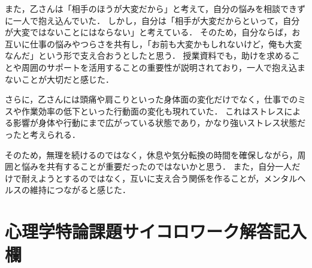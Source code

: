 \documentclass[titlepage,a4paper]{jsarticle}
\begin{document}
また，乙さんは「相手のほうが大変だから」と考えて，自分の悩みを相談できずに一人で抱え込んでいた．
しかし，自分は「相手が大変だからといって，自分が大変ではないことにはならない」と考えている．
そのため，自分ならば，お互いに仕事の悩みやつらさを共有し，「お前も大変かもしれないけど，俺も大変なんだ」という形で支え合おうとしたと思う．
授業資料でも，助けを求めることや周囲のサポートを活用することの重要性が説明されており，一人で抱え込まないことが大切だと感じた．

さらに，乙さんには頭痛や肩こりといった身体面の変化だけでなく，仕事でのミスや作業効率の低下といった行動面の変化も現れていた．
これはストレスによる影響が身体や行動にまで広がっている状態であり，かなり強いストレス状態だったと考えられる．

そのため，無理を続けるのではなく，休息や気分転換の時間を確保しながら，周囲と悩みを共有することが重要だったのではないかと思う．
また，自分一人だけで耐えようとするのではなく，互いに支え合う関係を作ることが，メンタルヘルスの維持につながると感じた．

\newpage
\section{心理学特論課題サイコロワーク解答記入欄}
\end{document}
